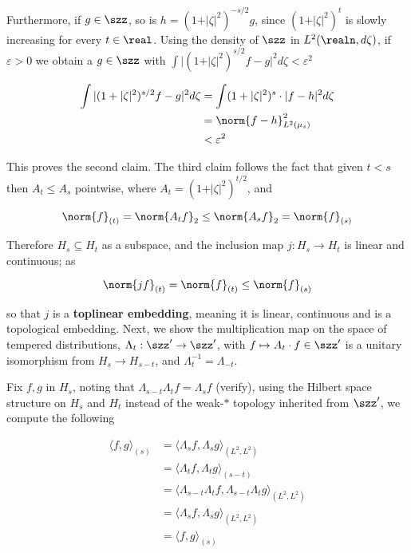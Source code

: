 Furthermore, if \(g\in \szz\), so is
\(h = (1+\vert\zeta\vert^2)^{-s/2}g\), since
\((1+\vert\zeta\vert^2)^{t}\) is slowly increasing for every
\(t\in\real\). Using the density of \(\szz\) in \(L^2(\realn, d\zeta)\),
if \(\varepsilon>0\) we obtain a \(g\in\szz\) with
\(\int \vert (1+\vert\zeta\vert^2)^{s/2}f - g\vert^2d\zeta < \varepsilon^2\)

\[
\begin{align}
\int \vert (1+\vert\zeta\vert^2)^{s/2}f - g\vert^2d\zeta &= \int (1+\vert\zeta\vert^2)^{s}\cdot \vert f-h\vert^2d\zeta\\
&=\norm{f-h}_{L^2(\mu_s)}^2\\
&< \varepsilon^2
\end{align}
\]

This proves the second claim. The third claim follows the fact that
given \(t<s\) then \(A_t\leq A_s\) pointwise, where
\(A_t = (1+\vert\zeta\vert^2)^{t/2}\), and

\[
\norm{f}_{(t)} = \norm{A_t f}_{2}\leq \norm{A_s f}_{2} = \norm{f}_{(s)}
\]

Therefore \(H_s\subseteq H_t\) as a subspace, and the inclusion map
\(j: H_s\to H_t\) is linear and continuous; as

\[
\norm{jf}_{(t)}= \norm{f}_{(t)}\leq \norm{f}_{(s)}
\]

so that \(j\) is a \textbf{toplinear embedding}, meaning it is linear,
continuous and is a topological embedding. Next, we show the
multiplication map on the space of tempered distributions,
\(\Lambda_t: \szz'\to \szz'\), with \(f\mapsto A_t\cdot f\in \szz'\) is
a unitary isomorphism from \(H_s\to H_{s-t}\), and
\(\Lambda_t^{-1} = \Lambda_{-t}\).

Fix \(f,g\) in \(H_s\), noting that
\(\Lambda_{s-t}\Lambda_{t} f = \Lambda_s f\) (verify), using the Hilbert
space structure on \(H_s\) and \(H_t\) instead of the weak-\(\ast\)
topology inherited from \(\szz'\), we compute the following

\[
\begin{align}
\langle f,g\rangle_{(s)}&= \langle \Lambda_s f,\Lambda_s g \rangle_{(L^2, L^2)}\\
&= \langle \Lambda_t f,\Lambda_t g \rangle_{(s-t)} \\
&= \langle\Lambda_{s-t}\Lambda_{t} f, \Lambda_{s-t}\Lambda_{t} g  \rangle_{(L^2, L^2)}\\
&= \langle \Lambda_{s}f, \Lambda_{s} g \rangle_{(L^2,L^2)}\\
&= \langle f,g\rangle_{(s)}
\end{align}
\]

